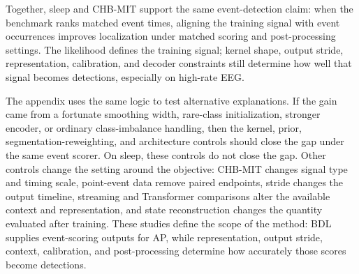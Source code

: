 Together, sleep and CHB-MIT support the same event-detection claim: when the benchmark ranks matched event times, aligning the training signal with event occurrences improves localization under matched scoring and post-processing settings.
The likelihood defines the training signal; kernel shape, output stride, representation, calibration, and decoder constraints still determine how well that signal becomes detections, especially on high-rate EEG.

The appendix uses the same logic to test alternative explanations.
If the gain came from a fortunate smoothing width, rare-class initialization, stronger encoder, or ordinary class-imbalance handling, then the kernel, prior, segmentation-reweighting, and architecture controls should close the gap under the same event scorer.
On sleep, these controls do not close the gap.
Other controls change the setting around the objective: CHB-MIT changes signal type and timing scale, point-event data remove paired endpoints, stride changes the output timeline, streaming and Transformer comparisons alter the available context and representation, and state reconstruction changes the quantity evaluated after training.
These studies define the scope of the method: BDL supplies event-scoring outputs for AP, while representation, output stride, context, calibration, and post-processing determine how accurately those scores become detections.


